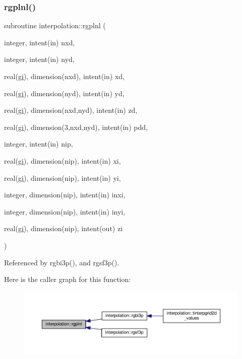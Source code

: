 \subsubsection{\texorpdfstring{rgplnl()}{rgplnl()}}
{\footnotesize\ttfamily subroutine interpolation\+::rgplnl (\begin{DoxyParamCaption}\item[{integer, intent(in)}]{nxd,  }\item[{integer, intent(in)}]{nyd,  }\item[{real(\mbox{\hyperlink{namespaceinterpolation_a7242dea48715e8170bae81efe12c64be}{gi}}), dimension(nxd), intent(in)}]{xd,  }\item[{real(\mbox{\hyperlink{namespaceinterpolation_a7242dea48715e8170bae81efe12c64be}{gi}}), dimension(nyd), intent(in)}]{yd,  }\item[{real(\mbox{\hyperlink{namespaceinterpolation_a7242dea48715e8170bae81efe12c64be}{gi}}), dimension(nxd,nyd), intent(in)}]{zd,  }\item[{real(\mbox{\hyperlink{namespaceinterpolation_a7242dea48715e8170bae81efe12c64be}{gi}}), dimension(3,nxd,nyd), intent(in)}]{pdd,  }\item[{integer, intent(in)}]{nip,  }\item[{real(\mbox{\hyperlink{namespaceinterpolation_a7242dea48715e8170bae81efe12c64be}{gi}}), dimension(nip), intent(in)}]{xi,  }\item[{real(\mbox{\hyperlink{namespaceinterpolation_a7242dea48715e8170bae81efe12c64be}{gi}}), dimension(nip), intent(in)}]{yi,  }\item[{integer, dimension(nip), intent(in)}]{inxi,  }\item[{integer, dimension(nip), intent(in)}]{inyi,  }\item[{real(\mbox{\hyperlink{namespaceinterpolation_a7242dea48715e8170bae81efe12c64be}{gi}}), dimension(nip), intent(out)}]{zi }\end{DoxyParamCaption})}



Referenced by rgbi3p(), and rgsf3p().

Here is the caller graph for this function\+:
\nopagebreak
\begin{figure}[H]
\begin{center}
\leavevmode
\includegraphics[width=350pt]{namespaceinterpolation_ab2d80355a943b73b1de2cef700693500_icgraph}
\end{center}
\end{figure}
\mbox{\label{namespaceinterpolation_a1e2786e4f0a0a9dd065f757b66de84fd}} 
